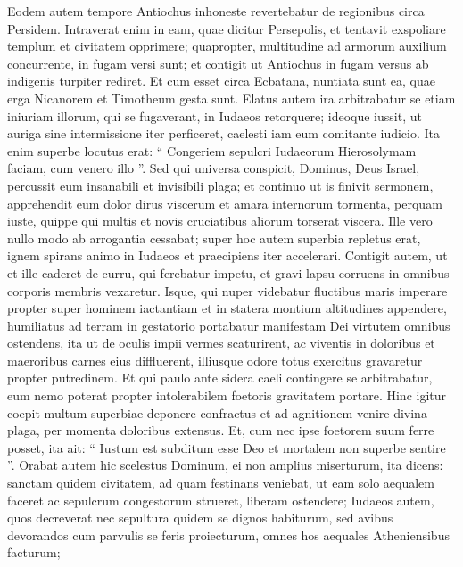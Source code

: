 \begin{biblechapter}
\begin{biblechapter}
\begin{biblechapter}
\begin{biblechapter}
\begin{biblechapter}
\begin{biblechapter}
\begin{biblechapter}
\begin{biblechapter}
\begin{biblechapter}
\verse Eodem autem tempore Antiochus inhoneste revertebatur de regionibus circa Persidem. 
\verse Intraverat enim in eam, quae dicitur Persepolis, et tentavit exspoliare templum et civitatem opprimere; quapropter, multitudine ad armorum auxilium concurrente, in fugam versi sunt; et contigit ut Antiochus in fugam versus ab indigenis turpiter rediret. 
\verse Et cum esset circa Ecbatana, nuntiata sunt ea, quae erga Nicanorem et Timotheum gesta sunt. 
\verse Elatus autem ira arbitrabatur se etiam iniuriam illorum, qui se fugaverant, in Iudaeos retorquere; ideoque iussit, ut auriga sine intermissione iter perficeret, caelesti iam eum comitante iudicio. Ita enim superbe locutus erat: “ Congeriem sepulcri Iudaeorum Hierosolymam faciam, cum venero illo ”.
 \verse Sed qui universa conspicit, Dominus, Deus Israel, percussit eum insanabili et invisibili plaga; et continuo ut is finivit sermonem, apprehendit eum dolor dirus viscerum et amara internorum tormenta, 
\verse perquam iuste, quippe qui multis et novis cruciatibus aliorum torserat viscera. 
\verse Ille vero nullo modo ab arrogantia cessabat; super hoc autem superbia repletus erat, ignem spirans animo in Iudaeos et praecipiens iter accelerari. Contigit autem, ut et ille caderet de curru, qui ferebatur impetu, et gravi lapsu corruens in omnibus corporis membris vexaretur. 
\verse Isque, qui nuper videbatur fluctibus maris imperare propter super hominem iactantiam et in statera montium altitudines appendere, humiliatus ad terram in gestatorio portabatur manifestam Dei virtutem omnibus ostendens, 
\verse ita ut de oculis impii vermes scaturirent, ac viventis in doloribus et maeroribus carnes eius diffluerent, illiusque odore totus exercitus gravaretur propter putredinem. 
\verse Et qui paulo ante sidera caeli contingere se arbitrabatur, eum nemo poterat propter intolerabilem foetoris gravitatem portare.
 \verse Hinc igitur coepit multum superbiae deponere confractus et ad agnitionem venire divina plaga, per momenta doloribus extensus. 
\verse Et, cum nec ipse foetorem suum ferre posset, ita ait: “ Iustum est subditum esse Deo et mortalem non superbe sentire ”. 
\verse Orabat autem hic scelestus Dominum, ei non amplius miserturum, ita dicens: 
\verse sanctam quidem civitatem, ad quam festinans veniebat, ut eam solo aequalem faceret ac sepulcrum congestorum strueret, liberam ostendere; 
\verse Iudaeos autem, quos decreverat nec sepultura quidem se dignos habiturum, sed avibus devorandos cum parvulis se feris proiecturum, omnes hos aequales Atheniensibus facturum; 

\end{biblechapter}
\end{biblechapter}
\end{biblechapter}
\end{biblechapter}
\end{biblechapter}
\end{biblechapter}
\end{biblechapter}
\end{biblechapter}
\end{biblechapter}
